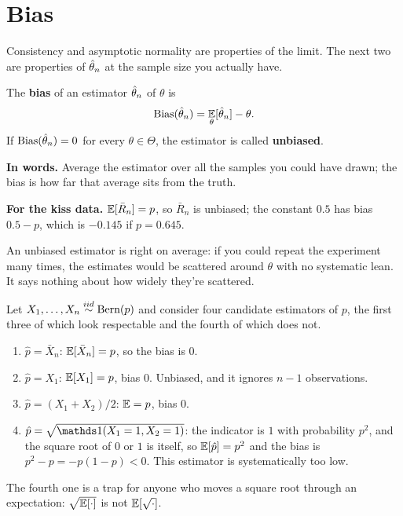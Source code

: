 \section{Bias}
\label{sec:est-bias}

Consistency and asymptotic normality are properties of the limit.
The next two are properties of $\hat{\theta}_n$ at the sample size you actually have.

\begin{definition}[Bias]
\label{def:bias}
The \textbf{bias} of an estimator $\hat{\theta}_n$ of $\theta$ is
\[
\text{Bias}(\hat{\theta}_n) = \operatorname*{\mathbb{E}}_\theta[\hat{\theta}_n] - \theta.
\]
If $\text{Bias}(\hat{\theta}_n) = 0$ for every $\theta \in \Theta$, the estimator is called \textbf{unbiased}.
\end{definition}

\begin{inwords}
\textbf{In words.} Average the estimator over all the samples you could have drawn; the bias is how far that average sits from the truth.
\par\smallskip
\textbf{For the kiss data.} $\operatorname*{\mathbb{E}}[\bar{R}_n] = p$, so $\bar{R}_n$ is unbiased; the constant $0.5$ has bias $0.5 - p$, which is $-0.145$ if $p = 0.645$.
\end{inwords}

An unbiased estimator is right on average: if you could repeat the experiment many times, the estimates would be scattered around $\theta$ with no systematic lean.
It says nothing about how widely they're scattered.

\begin{worked}
Let $X_1, \ldots, X_n \stackrel{iid}{\sim} \text{Bern}(p)$ and consider four candidate estimators of $p$, the first three of which look respectable and the fourth of which does not.
\begin{enumerate}[nosep]
\item $\hat{p} = \bar{X}_n$: $\operatorname*{\mathbb{E}}[\bar{X}_n] = p$, so the bias is $0$.
\item $\hat{p} = X_1$: $\operatorname*{\mathbb{E}}[X_1] = p$, bias $0$. Unbiased, and it ignores $n - 1$ observations.
\item $\hat{p} = (X_1 + X_2)/2$: $\operatorname*{\mathbb{E}} = p$, bias $0$.
\item $\hat{p} = \sqrt{\ind(X_1 = 1, X_2 = 1)}$: the indicator is $1$ with probability $p^2$, and the square root of $0$ or $1$ is itself, so $\operatorname*{\mathbb{E}}[\hat{p}] = p^2$ and the bias is $p^2 - p = -p(1-p) < 0$.
This estimator is systematically too low.
\end{enumerate}
The fourth one is a trap for anyone who moves a square root through an expectation: $\sqrt{\operatorname*{\mathbb{E}}[\cdot]}$ is not $\operatorname*{\mathbb{E}}[\sqrt{\cdot}]$.
\end{worked}

